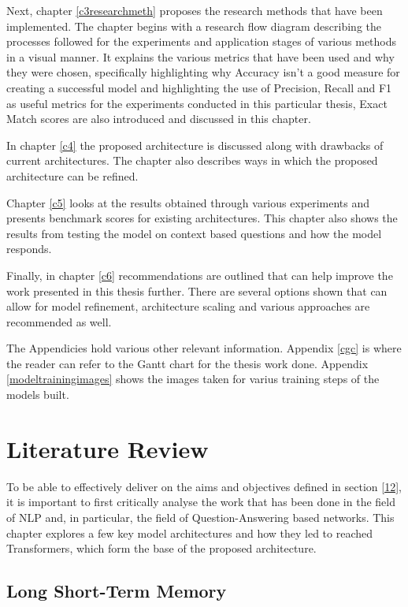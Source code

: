 \documentclass[a4paper,12pt]{report}
\begin{document}
        Next, chapter \ref{c3researchmeth} proposes the research methods that have been implemented. The chapter begins with a research flow diagram describing the processes followed for the experiments and application stages of various methods in a visual manner. It explains the various metrics that have been used and why they were chosen, specifically highlighting why Accuracy isn't a good measure for creating a successful model and highlighting the use of Precision, Recall and F1 as useful metrics for the experiments conducted in this particular thesis, Exact Match scores are also introduced and discussed in this chapter. 


        In chapter \ref{c4} the proposed architecture is discussed along with drawbacks of current architectures. The chapter also describes ways in which the proposed architecture can be refined.

        Chapter \ref{c5} looks at the results obtained through various experiments and presents benchmark scores for existing architectures. This chapter also shows the results from testing the model on context based questions and how the model responds.
        
        Finally, in chapter \ref{c6} recommendations are outlined that can help improve the work presented in this thesis further. There are several options shown that can allow for model refinement, architecture scaling and various approaches are recommended as well. 
        
        The Appendicies hold various other relevant information. Appendix \ref{cgc} is where the reader can refer to the Gantt chart for the thesis work done. Appendix \ref{modeltrainingimages} shows the images taken for varius training steps of the models built.

    \chapter{Literature Review}\label{c2litrev}

    To be able to effectively deliver on the aims and objectives defined in section \ref{12}, it is important to first critically analyse the work that has been done in the field of NLP and, in particular, the field of Question-Answering based networks. This chapter explores a few key model architectures and how they led to reached Transformers, which form the base of the proposed architecture.



        \section{Long Short-Term Memory}\label{22}
\end{document}
